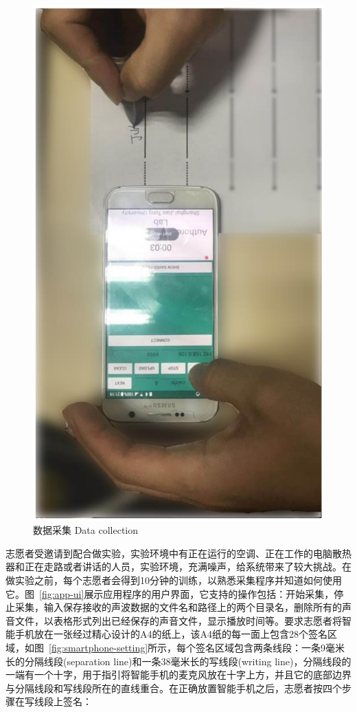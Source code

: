 \begin{figure}
\begin{minipage}[t]{0.32\textwidth}
    \includegraphics[width=\textwidth]{figure/app-data-collection.pdf}
    \bicaption
    {数据采集}
    {Data collection}
    \label{fig:data-collection}
   \end{minipage}
\end{figure}

志愿者受邀请到配合做实验，实验环境中有正在运行的空调、正在工作的电脑散热器和正在走路或者讲话的人员，实验环境，充满噪声，给系统带来了较大挑战。在做实验之前，每个志愿者会得到10分钟的训练，以熟悉采集程序并知道如何使用它。图~\ref{fig:app-ui}展示应用程序的用户界面，它支持的操作包括：开始采集，停止采集，输入保存接收的声波数据的文件名和路径上的两个目录名，删除所有的声音文件，以表格形式列出已经保存的声音文件，显示播放时间等。要求志愿者将智能手机放在一张经过精心设计的A4的纸上，该A4纸的每一面上包含28个签名区域，如图~\ref{fig:smartphone-setting}所示，每个签名区域包含两条线段：一条9毫米长的分隔线段(separation line)和一条38毫米长的写线段(writing line)，分隔线段的一端有一个十字，用于指引将智能手机的麦克风放在十字上方，并且它的底部边界与分隔线段和写线段所在的直线重合。在正确放置智能手机之后，志愿者按四个步骤在写线段上签名：

